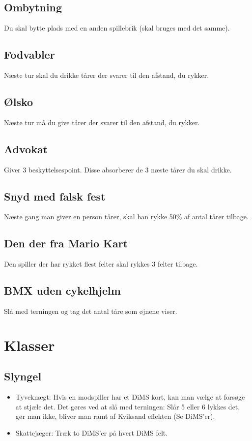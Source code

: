 \documentclass{article}
\begin{document}
\subsection{Ombytning} 
Du skal bytte plads med en anden spillebrik (skal bruges med det samme).
 
\subsection{Fodvabler} 
Næste tur skal du drikke tårer der svarer til den afstand, du rykker.
 
\subsection{Ølsko} 
Næste tur må du give tårer der svarer til den afstand, du rykker.
 
\subsection{Advokat} 
Giver 3 beskyttelsespoint. Disse absorberer de 3 næste tårer du skal drikke.
 
\subsection{Snyd med falsk fest} 
Næste gang man giver en person tårer, skal han rykke 50\% af antal tårer tilbage.
 
\subsection{Den der fra Mario Kart} 
Den spiller der har rykket flest felter skal rykkes 3 felter tilbage.
 
\subsection{BMX uden cykelhjelm} 
Slå med terningen og tag det antal tåre som øjnene viser.

\section{Klasser}
 
\subsection{Slyngel}
\begin{itemize}
	\item Tyveknægt: Hvis en modspiller har et DiMS kort, kan man vælge at forsøge at stjæle det. Det gøres ved at slå med terningen: Slår 5 eller 6 lykkes det, gør man ikke, bliver man ramt af Kviksand effekten (Se DiMS'er).
	\item Skattejæger: Træk to DiMS'er på hvert DiMS felt.
\end{itemize}
 
\end{document}
